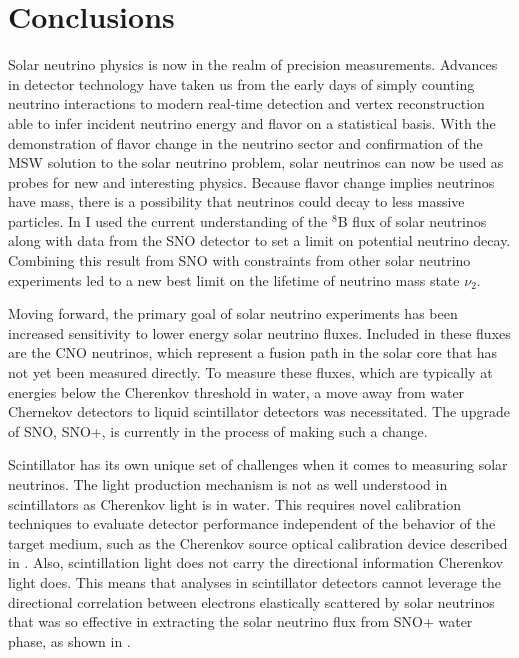 \chapter{Conclusions}

Solar neutrino physics is now in the realm of precision measurements.
Advances in detector technology have taken us from the early days of simply counting neutrino interactions to modern real-time detection and vertex reconstruction able to infer incident neutrino energy and flavor on a statistical basis.
With the demonstration of flavor change in the neutrino sector and confirmation of the MSW solution to the solar neutrino problem, solar neutrinos can now be used as probes for new and interesting physics.
Because flavor change implies neutrinos have mass, there is a possibility that neutrinos could decay to less massive particles.
In  I used the current understanding of the $^8$B flux of solar neutrinos along with data from the SNO detector to set a limit on potential neutrino decay.
Combining this result from SNO with constraints from other solar neutrino experiments led to a new best limit on the lifetime of neutrino mass state $\nu_2$.

Moving forward, the primary goal of solar neutrino experiments has been increased sensitivity to lower energy solar neutrino fluxes.
Included in these fluxes are the CNO neutrinos, which represent a fusion path in the solar core that has not yet been measured directly.
To measure these fluxes, which are typically at energies below the Cherenkov threshold in water, a move away from water Chernekov detectors to liquid scintillator detectors was necessitated.
The upgrade of SNO, SNO+, is currently in the process of making such a change.

Scintillator has its own unique set of challenges when it comes to measuring solar neutrinos.
The light production mechanism is not as well understood in scintillators as Cherenkov light is in water.
This requires novel calibration techniques to evaluate detector performance independent of the behavior of the target medium, such as the Cherenkov source optical calibration device described in .
Also, scintillation light does not carry the directional information Cherenkov light does.
This means that analyses in scintillator detectors cannot leverage the directional correlation between electrons elastically scattered by solar neutrinos that was so effective in extracting the solar neutrino flux from SNO+ water phase, as shown in .


